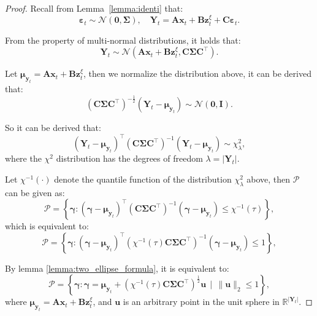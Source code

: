 \documentclass{article}
\theoremstyle{plain}
\theoremstyle{definition}
\theoremstyle{remark}
\def \x {\mathbf{x}}
\def \sP {\mathcal{P}}
\def \Y {\mathbf{Y}}
\def \I {\mathbf{I}}
\def \C {\mathbf{C}}
\def \y {\mathbf{y}}
\def \z {\mathbf{z}}
\def \u {\mathbf{u}}
\begin{document}
\begin{proof}
  Recall from Lemma~\ref{lemma:identi} that:
\begin{equation*}
  \bm{\varepsilon}_t\sim \mathcal{N}\left(\bm{0}, \bm{\Sigma}\right),\quad \mathbf{Y}_t = \mathbf{A}\x_t+\mathbf{B}\z_t^{\xi}+\mathbf{C}\bm{\varepsilon}_t. 
\end{equation*}

From the property of multi-normal distributions, it holds that: 
\begin{equation*}
  \mathbf{Y}_t \sim \mathcal{N}\left(\mathbf{A}\x_t+\mathbf{B}\z_t^{\xi}, \C \bm{\Sigma} \C^\top \right).
\end{equation*}



Let $\bm{\mu}_{\y_t} = \mathbf{A}\x_t+\mathbf{B}\z_t^{\xi}$, then we normalize the distribution above, it can be derived that: 
\begin{equation*}
  \left(\C \bm{\Sigma} \C^\top\right)^{-\frac12}\left(\Y_t-\bm{\mu}_{\y_t}\right)\sim \mathcal{N}\left(\bm{0}, \bm{\I}\right).
\end{equation*}

So it can be derived that:
\begin{equation*}
  \left(\Y_t-\bm{\mu}_{\y_t}\right)^\top \left(\C \bm{\Sigma} \C^\top\right)^{-1} \left(\Y_t-\bm{\mu}_{\y_t}\right) \sim \chi^2_\lambda,
\end{equation*}
where the $\chi^2$ distribution has the degrees of freedom $\lambda = \left|\Y_t\right|$. 

Let $\chi^{-1}(\cdot)$ denote the quantile function of the distribution $\chi^2_\lambda$ above, then $\sP$ can be given as:
\begin{equation*}
  \sP=\left\{\bm{\gamma}: \left(\bm{\gamma}-\bm{\mu}_{\y_t}\right)^\top \left(\C \bm{\Sigma} \C^\top\right)^{-1} \left(\bm{\gamma}-\bm{\mu}_{\y_t}\right)\leq \chi^{-1}(\tau)\right\},
\end{equation*}
which is equivalent to:
\begin{equation*}
  \sP=\left\{\bm{\gamma}: \left(\bm{\gamma}-\bm{\mu}_{\y_t}\right)^\top \left(\chi^{-1}(\tau) \C \bm{\Sigma} \C^\top\right)^{-1} \left(\bm{\gamma}-\bm{\mu}_{\y_t}\right)\leq 1\right\},
\end{equation*}

By lemma \ref{lemma:two_ellipse_formula}, it is equivalent to:
\begin{equation*}
  \sP=\left\{\bm{\gamma}:\bm{\gamma} = \bm{\mu}_{\y_t} + \left(\chi^{-1}(\tau)\C\bm{\Sigma}\C^\top\right)^\frac{1}{2}\u\ \ \bigg|\ \ \|\u\|_2\leq 1\right\},
\end{equation*}
where $\bm{\mu}_{\y_t} = \mathbf{A}\x_t+\mathbf{B}\z_t^{\xi}$, and $\u$ is an arbitrary point in the unit sphere in $\mathbb{R}^{|\Y_t|}$. 
\end{proof}
\end{document}
